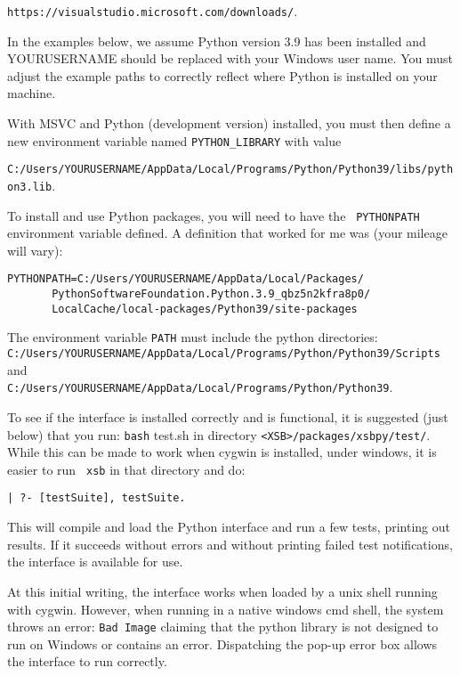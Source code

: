 {\tt https://visualstudio.microsoft.com/downloads/}.

In the examples below, we assume Python version 3.9 has been installed
and YOURUSERNAME should be replaced with your Windows user name.
You must adjust the example paths to correctly
reflect where Python is installed on your machine.

With MSVC and Python (development version) installed, you must then
define a new environment variable named {\tt PYTHON\_LIBRARY} with
value

{\tt C:/Users/YOURUSERNAME/AppData/Local/Programs/Python/Python39/libs/python3.lib}.

To install and use Python packages, you will need to have the {\tt
  PYTHONPATH} environment variable defined.  A definition that worked
for me was (your mileage will vary):
\begin{verbatim}
PYTHONPATH=C:/Users/YOURUSERNAME/AppData/Local/Packages/
       PythonSoftwareFoundation.Python.3.9_qbz5n2kfra8p0/
       LocalCache/local-packages/Python39/site-packages
\end{verbatim}

The environment variable {\tt PATH} must include the python directories:\\
{\tt C:/Users/YOURUSERNAME/AppData/Local/Programs/Python/Python39/Scripts} and\\
{\tt C:/Users/YOURUSERNAME/AppData/Local/Programs/Python/Python39}.

To see if the interface is installed correctly and is functional, it
is suggested (just below) that you run: {\tt bash} test.sh in
directory {\tt <XSB>/packages/xsbpy/test/}.  While this can be made to
work when cygwin is installed, under windows, it is easier to run {\tt
  xsb} in that directory and do:
\begin{verbatim}
| ?- [testSuite], testSuite.
\end{verbatim}
This will compile and load the Python interface and run a few tests,
printing out results.  If it succeeds without errors and without
printing failed test notifications, the interface is available for
use.

At this initial writing, the interface works when loaded by a unix
shell running with cygwin.  However, when running in a native windows
cmd shell, the system throws an error: {\tt Bad Image} claiming that
the python library is not designed to run on Windows or contains an
error.  Dispatching the pop-up error box allows the interface to run
correctly.


